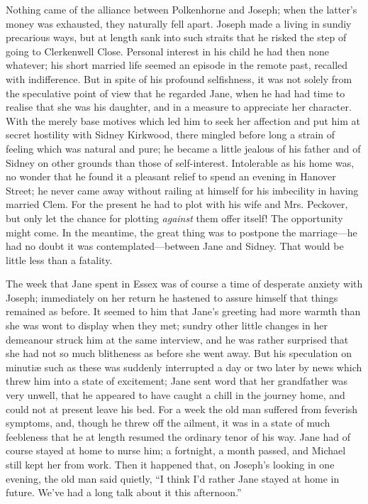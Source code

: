 Nothing came of the alliance between Polkenhorne and Joseph; when the
latter's money was exhausted, they naturally fell apart. Joseph made a
living in sundiy precarious ways, but at length sank into such {}straits
that he risked the step of going to Clerkenwell Close. Personal interest
in his child he had then none whatever; his short married life seemed an
episode in the remote past, recalled with indifference. But in spite of
his profound selfishness, it was not solely from the speculative point
of view that he regarded Jane, when he had had time to realise that she
was his daughter, and in a measure to appreciate her character. With the
merely base motives which led him to seek her affection and put him at
secret hostility with Sidney Kirkwood, there mingled before long a
strain of feeling which was natural and pure; he became a little jealous
of his father and of Sidney on other grounds than those of
self-interest. Intolerable as his home was, no wonder that he found it a
pleasant relief to spend an evening in Hanover Street; he never came
away without railing at himself for his imbecility in having married
Clem. For the present he had to plot with his wife and Mrs. Peckover,
but only let the chance for plotting \emph{against} them offer itself!
{}The opportunity might come. In the meantime, the great thing was to
postpone the marriage---he had no doubt it was contemplated---between
Jane and Sidney. That would be little less than a fatality.

The week that Jane spent in Essex was of course a time of desperate
anxiety with Joseph; immediately on her return he hastened to assure
himself that things remained as before. It seemed to him that Jane's
greeting had more warmth than she was wont to display when they met;
sundry other little changes in her demeanour struck him at the same
interview, and he was rather surprised that she had not so much
blitheness as before she went away. But his speculation on minutiæ such
as these was suddenly interrupted a day or two later by news which threw
him into a state of excitement; Jane sent word that her grandfather was
very unwell, that he appeared to have caught a chill in the journey
home, and could not at present leave his bed. For a week the old man
suffered from feverish symptoms, and, though he threw off the {}ailment,
it was in a state of much feebleness that he at length resumed the
ordinary tenor of his way. Jane had of course stayed at home to nurse
him; a fortnight, a month passed, and Michael still kept her from work.
Then it happened that, on Joseph's looking in one evening, the old man
said quietly, ``I think I'd rather Jane stayed at home in future. We've
had a long talk about it this afternoon.''

